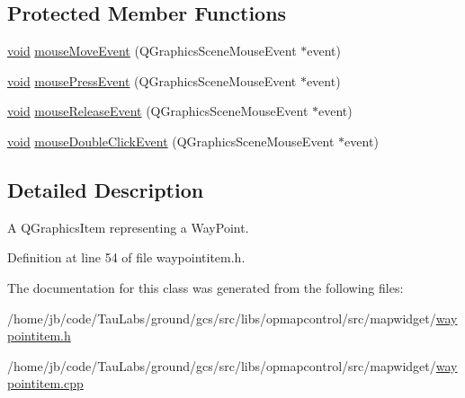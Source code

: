 \subsection*{\-Protected \-Member \-Functions}
\begin{DoxyCompactItemize}
\item 
\hyperlink{group___u_a_v_objects_plugin_ga444cf2ff3f0ecbe028adce838d373f5c}{void} \hyperlink{group___o_p_map_widget_ga6f89cd987bfc43501b2d48b05a98e542}{mouse\-Move\-Event} (\-Q\-Graphics\-Scene\-Mouse\-Event $\ast$event)
\item 
\hyperlink{group___u_a_v_objects_plugin_ga444cf2ff3f0ecbe028adce838d373f5c}{void} \hyperlink{group___o_p_map_widget_ga75c88df34476dc60c89f8611fec5868b}{mouse\-Press\-Event} (\-Q\-Graphics\-Scene\-Mouse\-Event $\ast$event)
\item 
\hyperlink{group___u_a_v_objects_plugin_ga444cf2ff3f0ecbe028adce838d373f5c}{void} \hyperlink{group___o_p_map_widget_gab66a8c1572009dbf0caad4c9a0109cfa}{mouse\-Release\-Event} (\-Q\-Graphics\-Scene\-Mouse\-Event $\ast$event)
\item 
\hyperlink{group___u_a_v_objects_plugin_ga444cf2ff3f0ecbe028adce838d373f5c}{void} \hyperlink{group___o_p_map_widget_ga8e95fece0c41ca37ee7878e84a03e700}{mouse\-Double\-Click\-Event} (\-Q\-Graphics\-Scene\-Mouse\-Event $\ast$event)
\end{DoxyCompactItemize}


\subsection{\-Detailed \-Description}
\-A \-Q\-Graphics\-Item representing a \-Way\-Point. 

\-Definition at line 54 of file waypointitem.\-h.



\-The documentation for this class was generated from the following files\-:\begin{DoxyCompactItemize}
\item 
/home/jb/code/\-Tau\-Labs/ground/gcs/src/libs/opmapcontrol/src/mapwidget/\hyperlink{waypointitem_8h}{waypointitem.\-h}\item 
/home/jb/code/\-Tau\-Labs/ground/gcs/src/libs/opmapcontrol/src/mapwidget/\hyperlink{waypointitem_8cpp}{waypointitem.\-cpp}\end{DoxyCompactItemize}
